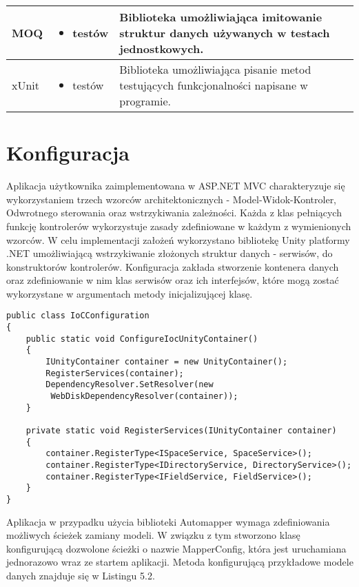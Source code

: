 \begin{center}
\begin{longtable}{ | p{2.2cm} | p{5cm} | p{6.5cm} |}
    \hline MOQ &  
    \begin{itemize} 
    	\item testów
    \end{itemize} 
    & Biblioteka umożliwiająca imitowanie struktur danych używanych w testach jednostkowych. \\ \hline
    
     \hline xUnit &  
    \begin{itemize} 
    	\item testów
    \end{itemize} 
    & Biblioteka umożliwiająca pisanie metod testujących funkcjonalności napisane w programie.  \\ \hline
	\end{longtable}
\end{center}

\newpage
\section{Konfiguracja}
Aplikacja użytkownika zaimplementowana w ASP.NET MVC charakteryzuje się wykorzystaniem trzech wzorców architektonicznych - Model-Widok-Kontroler, Odwrotnego sterowania oraz wstrzykiwania zależności. Każda z klas pełniących funkcję kontrolerów wykorzystuje zasady zdefiniowane w każdym z wymienionych wzorców. W celu implementacji założeń wykorzystano bibliotekę Unity platformy .NET umożliwiającą wstrzykiwanie złożonych struktur danych - serwisów, do konstruktorów kontrolerów. Konfiguracja zakłada stworzenie kontenera danych oraz zdefiniowanie w nim klas serwisów oraz ich interfejsów, które mogą zostać wykorzystane w argumentach metody inicjalizującej klasę.
\\

\begin{lstlisting}[caption=Konfiguracja kontenera Odwrotnego sterowania ]
public class IoCConfiguration
{
	public static void ConfigureIocUnityContainer()
	{
		IUnityContainer container = new UnityContainer();
		RegisterServices(container);
		DependencyResolver.SetResolver(new
		 WebDiskDependencyResolver(container));
	}

	private static void RegisterServices(IUnityContainer container)
	{
		container.RegisterType<ISpaceService, SpaceService>();
		container.RegisterType<IDirectoryService, DirectoryService>();
		container.RegisterType<IFieldService, FieldService>();
	}
}
\end{lstlisting}

Aplikacja w przypadku użycia biblioteki Automapper wymaga zdefiniowania możliwych ścieżek zamiany modeli. W związku z tym stworzono klasę konfigurującą dozwolone ścieżki o nazwie MapperConfig, która jest uruchamiana jednorazowo wraz ze startem aplikacji. Metoda konfigurującą przykładowe modele danych znajduje się w Listingu 5.2. 
\newpage

